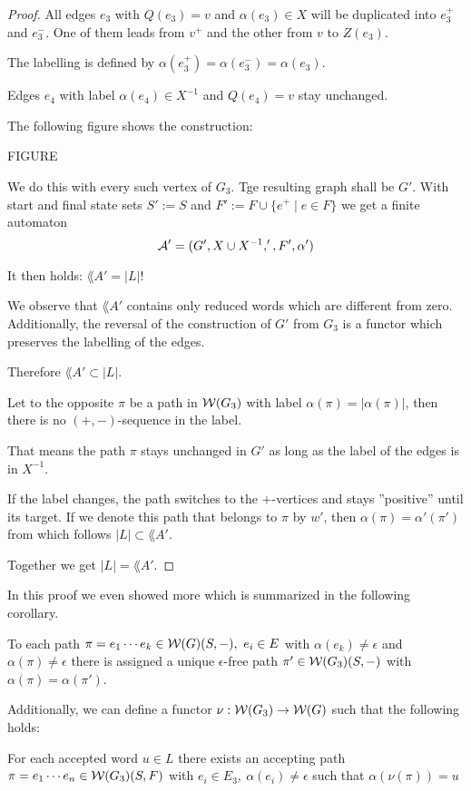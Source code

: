 \begin{proof}
All edges $e_3$ with $Q(e_3) = v$ and $\alpha(e_3) \in X$ will be duplicated
into $e_3^+$ and $e_3^-$. One of them leads from $v^+$ and the other from $v$ to
$Z(e_3)$.

The labelling is defined by $\alpha(e_3^+) = \alpha(e_3^-) = \alpha(e_3)$.

Edges $e_4$ with label $\alpha(e_4) \in X^{-1}$ and $Q(e_4) = v$ stay unchanged.

The following figure shows the construction:

FIGURE

We do this with every such vertex of $G_3$. Tge resulting graph shall be $G'$.
With start and final state sets $S' := S$ and $F' := F \cup \{e^+ \mid e\in F\}$
we get a finite automaton
\[ \mbox{$\mathcal{A}$}' = (G', X \cup X^{-1}, ', F', \alpha') \]

It then holds: $\lang{A}' = |L|$!

We observe that $\lang{A}'$ contains only reduced words which are different from
zero. Additionally, the reversal of the construction of $G'$ from $G_3$ is a
functor which preserves the labelling of the edges.

Therefore $\lang{A}' \subset |L|$.

Let to the opposite $\pi$ be a path in $\mbox{$\mathcal{W}(G_3)$}$ with label $\alpha(\pi)
= |\alpha(\pi)|$, then there is no $(+, -)$-sequence in the label.

That means the path $\pi$ stays unchanged in $G'$ as long as the label of the
edges is in $X^{-1}$.

If the label changes, the path switches to the $+$-vertices and stays
''positive'' until its target. If we denote this path that belongs to $\pi$ by
$w'$, then $\alpha(\pi) = \alpha'(\pi')$ from which follows $|L| \subset
\lang{A}'$.

Together we get $|L| = \lang{A'}$.
\end{proof}

In this proof we even showed more which is summarized in the following
corollary.

\begin{corollary}
To each path $\pi = e_1 \cdots e_k \in \mbox{$\mathcal{W}(G)$}(S, -),\ e_i \in E$ with
$\alpha(e_k) \neq \epsilon$ and $\alpha(\pi) \neq \epsilon$ there is assigned a
unique $\epsilon$-free path $\pi' \in \mbox{$\mathcal{W}(G_3)$}(S, -)$ with $\alpha(\pi) =
\alpha(\pi')$.

Additionally, we can define a functor $\nu : \mbox{$\mathcal{W}(G_3)$} \to \mbox{$\mathcal{W}(G)$}$ such
that the following holds:

For each accepted word $u \in L$ there exists an accepting path $\pi = e_1
\cdots e_n \in \mbox{$\mathcal{W}(G_3)$}(S, F)$ with $e_i \in E_3,\ \alpha(e_i) \neq \epsilon$ such
that $\alpha(\nu(\pi)) = u$
\end{corollary}

